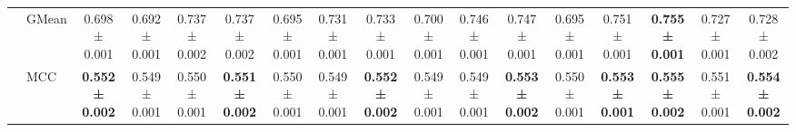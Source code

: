 \begin{table}[H]
{\begin{tabular}{llccccccccccccccc}
 & GMean & 0.698 ± 0.001 & 0.692 ± 0.001 & 0.737 ± 0.002 & 0.737 ± 0.002 & 0.695 ± 0.001 & 0.731 ± 0.001 & 0.733 ± 0.001 & 0.700 ± 0.001 & 0.746 ± 0.001 & 0.747 ± 0.001 & 0.695 ± 0.001 & 0.751 ± 0.001 & \textbf{0.755 ± 0.001} & 0.727 ± 0.001 & 0.728 ± 0.002 \\
 & MCC & \textbf{0.552 ± 0.002} & 0.549 ± 0.001 & 0.550 ± 0.001 & \textbf{0.551 ± 0.002} & 0.550 ± 0.001 & 0.549 ± 0.001 & \textbf{0.552 ± 0.002} & 0.549 ± 0.001 & 0.549 ± 0.001 & \textbf{0.553 ± 0.002} & 0.550 ± 0.001 & \textbf{0.553 ± 0.001} & \textbf{0.555 ± 0.002} & 0.551 ± 0.001 & \textbf{0.554 ± 0.002} \\
\cline{1-17}
\bottomrule
\end{tabular}
    }
\end{table}

